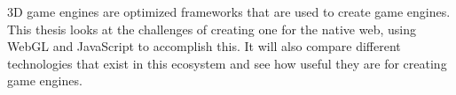 
3D game engines are optimized frameworks that are used to create game engines. This thesis looks at the challenges of creating one for the native web, using WebGL and JavaScript to accomplish this. It will also compare different technologies that exist in this ecosystem and see how useful they are for creating game engines.